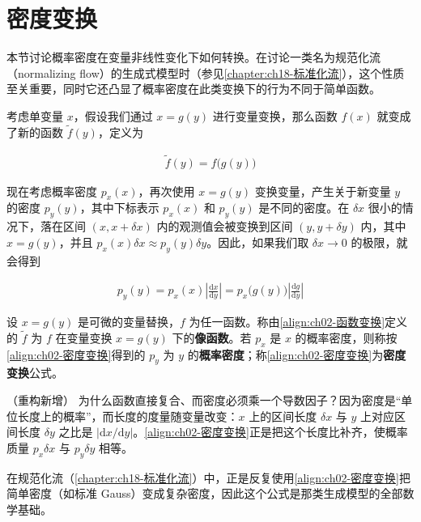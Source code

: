 \documentclass[../../main.tex]{subfiles}
\begin{document}
\section{密度变换}\label{section:ch02-密度变换}

本节讨论概率密度在变量非线性变化下如何转换。在讨论一类名为规范化流（normalizing flow）的生成式模型时（参见\cref{chapter:ch18-标准化流}），这个性质至关重要，同时它还凸显了概率密度在此类变换下的行为不同于简单函数。

考虑单变量 $x$，假设我们通过 $x=g(y)$ 进行变量变换，那么函数 $f(x)$ 就变成了新的函数 $\tilde{f}(y)$，定义为

\begin{align}
  \tilde{f}(y) = f\big(g(y)\big)
  \label{align:ch02-函数变换}
\end{align}

现在考虑概率密度 $p_x(x)$，再次使用 $x=g(y)$ 变换变量，产生关于新变量 $y$ 的密度 $p_y(y)$，其中下标表示 $p_x(x)$ 和 $p_y(y)$ 是不同的密度。在 $\delta x$ 很小的情况下，落在区间 $(x,x+\delta x)$ 内的观测值会被变换到区间 $(y,y+\delta y)$ 内，其中 $x=g(y)$，并且 $p_x(x)\delta x\approx p_y(y)\delta y$。因此，如果我们取 $\delta x\to0$ 的极限，就会得到

\begin{align}
  p_y(y) = p_x(x)\left|\frac{\mathrm{d}x}{\mathrm{d}y}\right| = p_x\big(g(y)\big)\left|\frac{\mathrm{d}g}{\mathrm{d}y}\right|
  \label{align:ch02-密度变换}
\end{align}

\begin{definition}[变量变换与密度变换]\label{definition:ch02-密度变换}
设 $x=g(y)$ 是可微的变量替换，$f$ 为任一函数。称由\eqref{align:ch02-函数变换}定义的 $\tilde{f}$ 为 $f$ 在变量变换 $x=g(y)$ 下的\textbf{像函数}。若 $p_x$ 是 $x$ 的概率密度，则称按\eqref{align:ch02-密度变换}得到的 $p_y$ 为 $y$ 的\textbf{概率密度}；称\eqref{align:ch02-密度变换}为\textbf{密度变换}公式。
\end{definition}

\begin{remark}（重构新增）
为什么函数直接复合、而密度必须乘一个导数因子？因为密度是“单位长度上的概率”，而长度的度量随变量改变：$x$ 上的区间长度 $\delta x$ 与 $y$ 上对应区间长度 $\delta y$ 之比是 $|\mathrm{d}x/\mathrm{d}y|$。\eqref{align:ch02-密度变换}正是把这个长度比补齐，使概率质量 $p_x\delta x$ 与 $p_y\delta y$ 相等。

在规范化流（\cref{chapter:ch18-标准化流}）中，正是反复使用\eqref{align:ch02-密度变换}把简单密度（如标准 Gauss）变成复杂密度，因此这个公式是那类生成模型的全部数学基础。
\end{remark}
\end{document}
